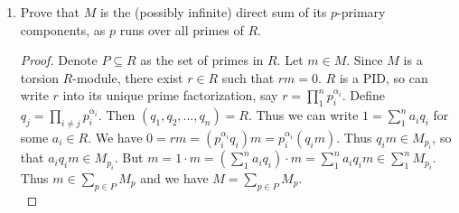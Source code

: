 \documentclass[8pt]{amsart}
\theoremstyle{plain}%
\theoremstyle{definition}
\theoremstyle{remark}
\numberwithin{equation}{section}
\newcommand{\N}{\mathbb{N}}
\begin{document}
\begin{enumerate}
\begin{proof}
				Conversely suppose that $m \in M_{p_i}$ then by definition there exists $j \in \N$ such that $p_i^jm = 0$. Consider $(a, p_i^j)$ and observe that since $R$ is a PID, it must follow that $(a, p_i^j) = (b)$ for some $b \in R$. But also note that $(p_i^j) \subseteq (a, p_i^j) = (b)$, so by property of ideals, we have $b \mid p_i^j$ which leads us to conclude by property of primes that $b = p_i^t$ for some $t \leq j$. But we also know that $(a) \subseteq (p_i^t)$ so it follows that
				\begin{align*}
					p_i^t &\mid p_1^{\alpha_1} \cdots p_{i - 1}^{\alpha_{i - 1}} p_i^{\alpha_i} p_{i + 1}^{\alpha_{i + 1}} \cdots p_n^{\alpha_n}\\
					p_i^{t - \alpha_i}p_i^{\alpha_i} &\mid  p_1^{\alpha_1} \cdots p_{i - 1}^{\alpha_{i - 1}} p_i^{\alpha_i} p_{i + 1}^{\alpha_{i + 1}} \cdots p_n^{\alpha_n}\\
					p_i^{t - \alpha_i} &\mid  p_1^{\alpha_1} \cdots p_{i - 1}^{\alpha_{i - 1}} p_{i + 1}^{\alpha_{i + 1}} \cdots p_n^{\alpha_n}
				\end{align*}
				So by definition $  p_1^{\alpha_1} \cdots p_{i - 1}^{\alpha_{i - 1}} p_{i + 1}^{\alpha_{i + 1}} \cdots p_n^{\alpha_n} = p_i^{t - \alpha_i}s$ for some $s \in R$. It must follow that $t - \alpha_i = 0$, or equivalently $t = \alpha_i$, because if it does not, we have a contradiction, since $p_i$ is not in $\{p_1, \ldots, p_{i-1}, p_{i + 1}, \ldots, p_n\}$. So since $(p_i^j) \subseteq (a, p_i^j) =  (p_i^{\alpha_i})$ we have $p_i^{\alpha_i} = p_i^j \cdot k$ for some $k \in R$. So $p_i^{\alpha_i}m = p_i^j \cdot k \cdot m = k \cdot (p_i^j \cdot m) = k \cdot 0 = 0$. Conclude that $m \in M_i$ and hence $M_{p_i} \subseteq M_i$.\\

				Finally, by double inclusion, we can conclude that $M_i = M_{p_i}$.
			\end{proof}
		\item Prove that $M$ is the (possibly infinite) direct sum of its $p$-primary components, as $p$ runs over all primes of $R$.
		\begin{proof}
		
		Denote $P \subseteq R$ as the set of primes in $R$. Let $m \in M$. Since $M$ is a torsion $R$-module, there exist $r \in R$ such that $rm =0$. $R$ is a PID, so can write $r$ into its unique prime factorization, say $r = \prod_1^n p_i^{\alpha_i}$. Define $q_j = \prod_{i\neq j} p_i^{\alpha_i}$. Then $(q_1,q_2,...,q_n) = R$. Thus we can write $1 = \sum_1^n a_iq_i$ for some $a_i \in R$. We have $0 = rm = (p_i^{\alpha_i}q_i)m = p_i^{\alpha_i}(q_im)$. Thus $q_im \in M_{p_i}$, so that $a_iq_im \in M_{p_i}$. But $m = 1\cdot m = (\sum_1^n a_iq_i )\cdot m = \sum_1^n a_iq_im \in \sum_1^n M_{p_i}$. Thus $m \in \sum_{p \in P} M_p$ and we have $M = \sum_{p \in P} M_p$. \\
		

\end{proof}
\end{enumerate}
\end{document}
